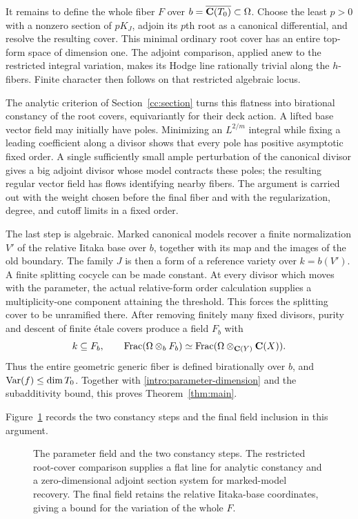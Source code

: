 It remains to define the whole fiber $F$ over
$b=\overline{\mathbf C(T_0)}\subset\Omega$. Choose the least $p>0$ with a nonzero section of $pK_J$, adjoin
its $p$th root as a canonical differential, and resolve the resulting
cover. This minimal ordinary root cover has an entire top-form space
of dimension one. The adjoint
comparison, applied anew to the restricted integral variation, makes
its Hodge line rationally trivial along the $h$-fibers. Finite
character then follows on that restricted algebraic locus.

The analytic criterion of Section~\ref{cc:section} turns this flatness
into birational constancy of the root covers, equivariantly for their
deck action. A lifted base vector field may initially have poles.
Minimizing an $L^{2/m}$ integral while fixing a leading coefficient
along a divisor shows that every pole has positive asymptotic fixed
order. A single sufficiently small ample perturbation of the canonical
divisor gives a big adjoint divisor whose model contracts these poles;
the resulting regular vector field has flows identifying nearby fibers.
The argument is carried out with the weight chosen before the final
fiber and with the regularization, degree, and cutoff limits in a
fixed order.

The last step is algebraic. Marked canonical models recover a finite
normalization $V'$ of the relative Iitaka base over $b$, together with
its map and the images of the old boundary. The family $J$ is then a
form of a reference variety over $k=b(V')$. A finite splitting cocycle
can be made constant. At every divisor which moves with the parameter,
the actual relative-form order calculation supplies a multiplicity-one
component attaining the threshold. This forces the splitting cover to
be unramified there. After removing finitely many fixed divisors,
purity and descent of finite \'etale covers produce a field $F_b$ with
\[
 k\subseteq F_b,
 \qquad
 \operatorname{Frac}(\Omega\otimes_bF_b)
   \simeq\operatorname{Frac}(\Omega\otimes_{\mathbf C(Y)}\mathbf C(X)).
\]
Thus the entire geometric generic fiber is defined birationally over
$b$, and $\operatorname{Var}(f)\leq\dim T_0$. Together with
\eqref{intro:parameter-dimension} and the subadditivity bound, this
proves Theorem~\ref{thm:main}.

Figure~\ref{fig:whole-fiber-route} records the two constancy steps and
the final field inclusion in this argument.

\begin{figure}[htbp]
\centering

\caption{The parameter field and the two constancy steps. The restricted
root-cover comparison supplies a flat line for analytic constancy and
a zero-dimensional adjoint section system for marked-model recovery.
The final field retains the relative Iitaka-base coordinates, giving
a bound for the variation of the whole $F$.}
\label{fig:whole-fiber-route}
\end{figure}

